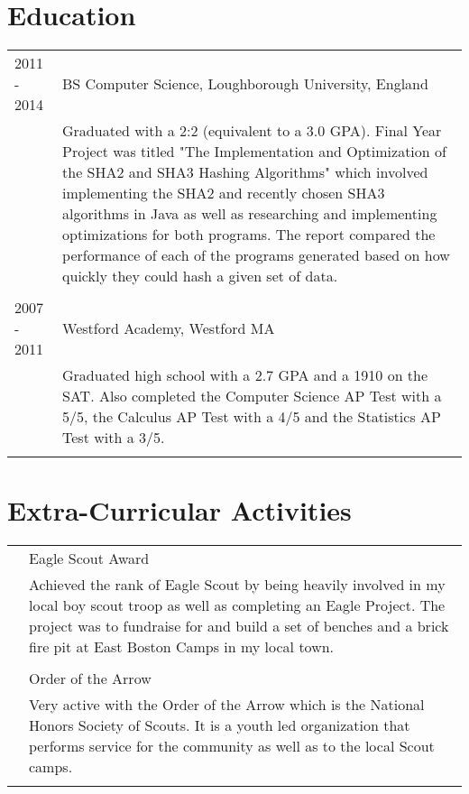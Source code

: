 \documentclass[10pt]{article}
\begin{document}
\section*{\selectfont Education}
\begin{tabular}{p{2.1cm}|p{14.9cm}}
	2011 - 2014 & BS Computer Science, Loughborough University, England\\&\footnotesize{Graduated with a 2:2 (equivalent to a 3.0 GPA). Final Year Project was titled "The Implementation and Optimization of the SHA2 and SHA3 Hashing Algorithms" which involved implementing the SHA2 and recently chosen SHA3 algorithms in Java as well as researching and implementing optimizations for both programs. The report compared the performance of each of the programs generated based on how quickly they could hash a given set of data.}\\\multicolumn{2}{c}{} \\
	2007 - 2011 & Westford Academy, Westford MA\\&\footnotesize{Graduated high school with a 2.7 GPA and a 1910 on the SAT. Also completed the Computer Science AP Test with a 5/5, the Calculus AP Test with a 4/5 and the Statistics AP Test with a 3/5.}\\\multicolumn{2}{c}{} \\
\end{tabular}

\section*{\selectfont Extra-Curricular Activities}
\begin{tabular}{p{2.1cm}|p{14.9cm}}
	& Eagle Scout Award\\&\footnotesize{Achieved the rank of Eagle Scout by being heavily involved in my local boy scout troop as well as completing an Eagle Project. The project was to fundraise for and build a set of benches and a brick fire pit at East Boston Camps in my local town.}\\\multicolumn{2}{c}{} \\
	& Order of the Arrow\\&\footnotesize{Very active with the Order of the Arrow which is the National Honors Society of Scouts. It is a youth led organization that performs service for the community as well as to the local Scout camps.}\\\multicolumn{2}{c}{} \\
\end{tabular}
\end{document}
